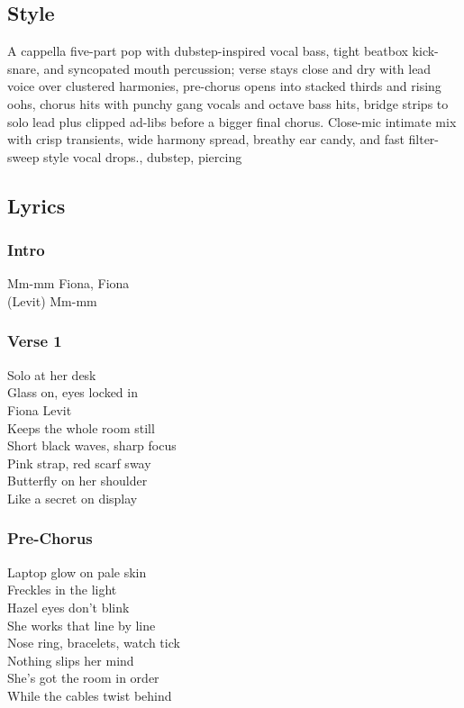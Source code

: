 \documentclass[]{article}
\begin{document}
\subsection{Style}\label{style-18}

A cappella five-part pop with dubstep-inspired vocal bass, tight beatbox
kick-snare, and syncopated mouth percussion; verse stays close and dry
with lead voice over clustered harmonies, pre-chorus opens into stacked
thirds and rising oohs, chorus hits with punchy gang vocals and octave
bass hits, bridge strips to solo lead plus clipped ad-libs before a
bigger final chorus. Close-mic intimate mix with crisp transients, wide
harmony spread, breathy ear candy, and fast filter-sweep style vocal
drops., dubstep, piercing

\subsection{Lyrics}\label{lyrics-18}

\subsubsection{Intro}\label{intro-7}

Mm-mm Fiona, Fiona\\
(Levit) Mm-mm

\subsubsection{Verse 1}\label{verse-1-11}

Solo at her desk\\
Glass on, eyes locked in\\
Fiona Levit\\
Keeps the whole room still\\
Short black waves, sharp focus\\
Pink strap, red scarf sway\\
Butterfly on her shoulder\\
Like a secret on display

\subsubsection{Pre-Chorus}\label{pre-chorus-16}

Laptop glow on pale skin\\
Freckles in the light\\
Hazel eyes don't blink\\
She works that line by line\\
Nose ring, bracelets, watch tick\\
Nothing slips her mind\\
She's got the room in order\\
While the cables twist behind
\end{document}
